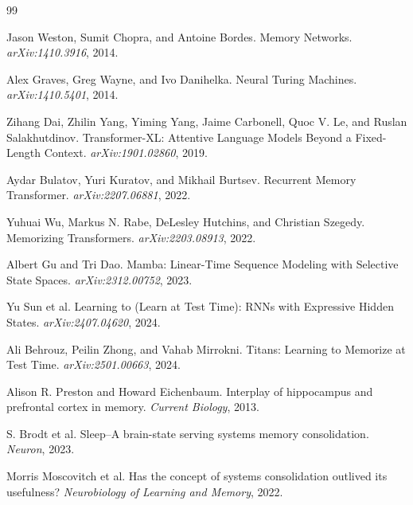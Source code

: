 \documentclass[11pt]{article}
\begin{document}
\begin{thebibliography}{99}

Jason Weston, Sumit Chopra, and Antoine Bordes.
\newblock Memory Networks.
\newblock \emph{arXiv:1410.3916}, 2014.

Alex Graves, Greg Wayne, and Ivo Danihelka.
\newblock Neural Turing Machines.
\newblock \emph{arXiv:1410.5401}, 2014.

Zihang Dai, Zhilin Yang, Yiming Yang, Jaime Carbonell, Quoc V. Le, and Ruslan Salakhutdinov.
\newblock Transformer-XL: Attentive Language Models Beyond a Fixed-Length Context.
\newblock \emph{arXiv:1901.02860}, 2019.

Aydar Bulatov, Yuri Kuratov, and Mikhail Burtsev.
\newblock Recurrent Memory Transformer.
\newblock \emph{arXiv:2207.06881}, 2022.

Yuhuai Wu, Markus N. Rabe, DeLesley Hutchins, and Christian Szegedy.
\newblock Memorizing Transformers.
\newblock \emph{arXiv:2203.08913}, 2022.

Albert Gu and Tri Dao.
\newblock Mamba: Linear-Time Sequence Modeling with Selective State Spaces.
\newblock \emph{arXiv:2312.00752}, 2023.

Yu Sun et al.
\newblock Learning to (Learn at Test Time): RNNs with Expressive Hidden States.
\newblock \emph{arXiv:2407.04620}, 2024.

Ali Behrouz, Peilin Zhong, and Vahab Mirrokni.
\newblock Titans: Learning to Memorize at Test Time.
\newblock \emph{arXiv:2501.00663}, 2024.

Alison R. Preston and Howard Eichenbaum.
\newblock Interplay of hippocampus and prefrontal cortex in memory.
\newblock \emph{Current Biology}, 2013.

S. Brodt et al.
\newblock Sleep--A brain-state serving systems memory consolidation.
\newblock \emph{Neuron}, 2023.

Morris Moscovitch et al.
\newblock Has the concept of systems consolidation outlived its usefulness?
\newblock \emph{Neurobiology of Learning and Memory}, 2022.

\end{thebibliography}
\end{document}
